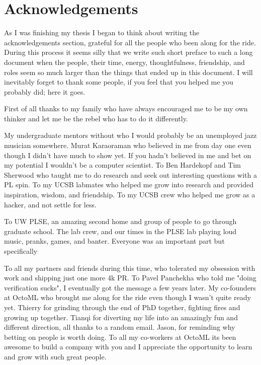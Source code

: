 \section{Acknowledgements}

As I was finishing my thesis I began to think about writing the
    acknowledgements section, grateful for all the people who
    been along for the ride.
During this process it seems silly that we write such short preface to such a long
    document when the people, their time, energy, thoughtfulness, friendship,
    and roles seem so much larger than the things that ended up in this
    document.
I will inevitably forget to thank some people,
    if you feel that you helped me you probably did; here it goes.

First of all thanks to my family who have always encouraged
    me to be my own thinker and let me be the rebel who
    has to do it differently.

My undergraduate mentors without who I would probably be an unemployed
    jazz musician somewhere.
Murat Karaoraman who believed in me from day one even though
    I didn't have much to show yet.
If you hadn't believed in me and bet on my potential
    I wouldn't be a computer scientist.
To Ben Hardekopf and Tim Sherwood who taught me to do research
    and seek out interesting questions with a PL spin.
To my UCSB labmates who helped me grow into research and
    provided inspiration, wisdom, and friendship.
To my UCSB crew who helped me grow as a hacker, and
    not settle for less.

To UW PLSE, an amazing second home and group of people to
    go through graduate school.
The lab crew, and our times in the PLSE lab playing loud
    music, pranks, games, and banter.
Everyone was an important part but specifically

To all my partners and friends during this time, who tolerated
    my obsession with work and shipping just one more 4k PR.
To Pavel Panchekha who told me "doing verification sucks",
    I eventually got the message a few years later.
My co-founders at OctoML who brought me along for the ride
    even though I wasn't quite ready yet.
Thierry for grinding through the end of PhD together,
    fighting fires and growing up together.
Tianqi for diverting my life into an amazingly fun and
    different direction, all thanks to a random email.
Jason, for reminding why betting on people is worth doing.
To all my co-workers at OctoML its been awesome to build
    a company with you and I appreciate the opportunity to
    learn and grow with such great people.

